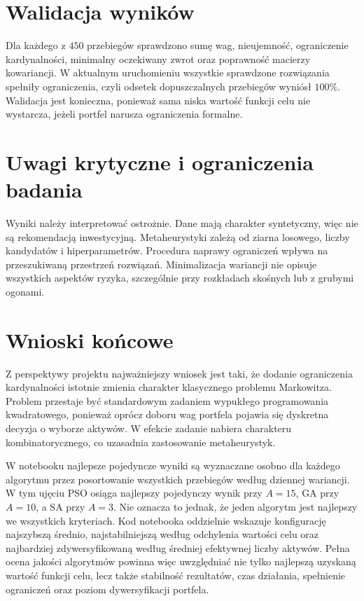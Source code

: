 \documentclass[12pt,a4paper]{article}
\begin{document}
\section{Walidacja wyników}
Dla każdego z $450$ przebiegów sprawdzono sumę wag, nieujemność, ograniczenie kardynalności, minimalny oczekiwany zwrot oraz poprawność macierzy kowariancji. W aktualnym uruchomieniu wszystkie sprawdzone rozwiązania spełniły ograniczenia, czyli odsetek dopuszczalnych przebiegów wyniósł $100\%$. Walidacja jest konieczna, ponieważ sama niska wartość funkcji celu nie wystarcza, jeżeli portfel narusza ograniczenia formalne.

\section{Uwagi krytyczne i ograniczenia badania}
Wyniki należy interpretować ostrożnie. Dane mają charakter syntetyczny, więc nie są rekomendacją inwestycyjną. Metaheurystyki zależą od ziarna losowego, liczby kandydatów i hiperparametrów. Procedura naprawy ograniczeń wpływa na przeszukiwaną przestrzeń rozwiązań. Minimalizacja wariancji nie opisuje wszystkich aspektów ryzyka, szczególnie przy rozkładach skośnych lub z grubymi ogonami.

\section{Wnioski końcowe}
Z perspektywy projektu najważniejszy wniosek jest taki, że dodanie ograniczenia 
kardynalności istotnie zmienia charakter klasycznego problemu Markowitza. Problem 
przestaje być standardowym zadaniem wypukłego programowania kwadratowego, ponieważ 
oprócz doboru wag portfela pojawia się dyskretna decyzja o wyborze aktywów. W efekcie 
zadanie nabiera charakteru kombinatorycznego, co uzasadnia zastosowanie metaheurystyk.

W notebooku najlepsze pojedyncze wyniki są wyznaczane osobno dla każdego algorytmu 
przez posortowanie wszystkich przebiegów według dziennej wariancji. W tym ujęciu PSO 
osiąga najlepszy pojedynczy wynik przy $A=15$, GA przy $A=10$, a SA przy $A=3$. Nie oznacza 
to jednak, że jeden algorytm jest najlepszy we wszystkich kryteriach. Kod notebooka 
oddzielnie wskazuje konfigurację najszybszą średnio, najstabilniejszą według odchylenia 
wartości celu oraz najbardziej zdywersyfikowaną według średniej efektywnej liczby aktywów. 
Pełna ocena jakości algorytmów powinna więc uwzględniać nie tylko najlepszą uzyskaną 
wartość funkcji celu, lecz także stabilność rezultatów, czas działania, spełnienie 
ograniczeń oraz poziom dywersyfikacji portfela.
\end{document}
